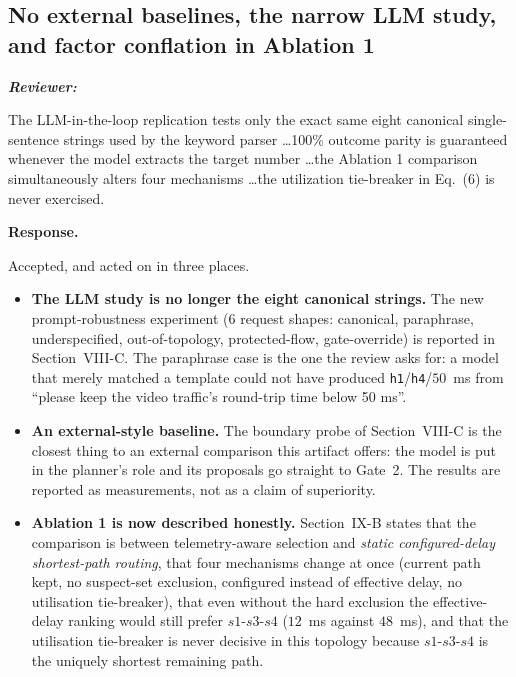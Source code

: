 \documentclass[11pt,a4paper]{article}
\newcommand{\PromptCases}{6}
\newenvironment{reviewer}{\par\medskip\noindent\begin{minipage}{\linewidth}\small\itshape\color{quote}\textbf{Reviewer:}\par}{\end{minipage}\medskip\par}
\newenvironment{response}{\par\noindent\begin{minipage}{\linewidth}\small\textbf{Response.}\par}{\end{minipage}\medskip\par}
\begin{document}
\subsection{No external baselines, the narrow LLM study, and factor
conflation in Ablation 1}

\begin{reviewer}
The LLM-in-the-loop replication tests only the exact same eight canonical
single-sentence strings used by the keyword parser \dots 100\% outcome
parity is guaranteed whenever the model extracts the target number \dots the
Ablation 1 comparison simultaneously alters four mechanisms \dots the
utilization tie-breaker in Eq.~(6) is never exercised.
\end{reviewer}

\begin{response}
Accepted, and acted on in three places.

\begin{itemize}
  \item \textbf{The LLM study is no longer the eight canonical strings.}
    The new prompt-robustness experiment ($\PromptCases$ request shapes:
    canonical, paraphrase, underspecified, out-of-topology,
    protected-flow, gate-override) is reported in Section~VIII-C. The
    paraphrase case is the one the review asks for: a model that merely
    matched a template could not have produced
    \texttt{h1}/\texttt{h4}/$50$~ms from ``please keep the video
    traffic's round-trip time below 50 ms''.
  \item \textbf{An external-style baseline.} The boundary probe of
    Section~VIII-C is the closest thing to an external comparison this
    artifact offers: the model is put in the planner's role and its
    proposals go straight to Gate~2. The results are reported as
    measurements, not as a claim of superiority.
  \item \textbf{Ablation 1 is now described honestly.} Section~IX-B states
    that the comparison is between telemetry-aware selection and
    \emph{static configured-delay shortest-path routing}, that four
    mechanisms change at once (current path kept, no suspect-set
    exclusion, configured instead of effective delay, no utilisation
    tie-breaker), that even without the hard exclusion the effective-delay
    ranking would still prefer $s1$-$s3$-$s4$ ($12$~ms against $48$~ms),
    and that the utilisation tie-breaker is never decisive in this
    topology because $s1$-$s3$-$s4$ is the uniquely shortest remaining
    path.
\end{itemize}
\end{response}
\end{document}
